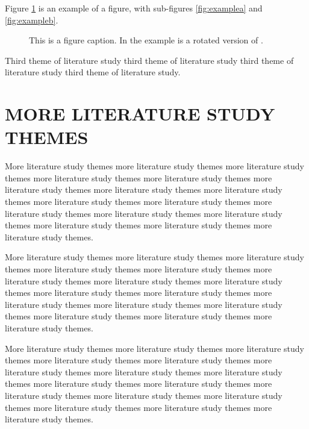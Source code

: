 Figure \ref{fig:example} is an example of a figure, with sub-figures
\ref{fig:examplea} and \ref{fig:exampleb}.
\begin{figure}[!ht]
  \begin{minipage}[b]{.5\linewidth}
  \centering{}
  \label{fig:examplea}
  \end{minipage}%
  \begin{minipage}[b]{.5\linewidth}
  \centering{}
  \label{fig:exampleb}
  \end{minipage}
  \caption{This is a figure caption. In the example 
  is a rotated version of .}\label{fig:example}
\end{figure}

Third theme of literature study third theme of literature study third
theme of literature study third theme of literature study.

\section{MORE LITERATURE STUDY THEMES}

More literature study themes more literature study themes more
literature study themes more literature study themes more literature
study themes more literature study themes more literature study themes
more literature study themes more literature study themes more
literature study themes more literature study themes more literature
study themes more literature study themes more literature study themes
more literature study themes more literature study themes.

More literature study themes more literature study themes more
literature study themes more literature study themes more literature
study themes more literature study themes more literature study themes
more literature study themes more literature study themes more
literature study themes more literature study themes more literature
study themes more literature study themes more literature study themes
more literature study themes more literature study themes.

More literature study themes more literature study themes more
literature study themes more literature study themes more literature
study themes more literature study themes more literature study themes
more literature study themes more literature study themes more
literature study themes more literature study themes more literature
study themes more literature study themes more literature study themes
more literature study themes more literature study themes.

